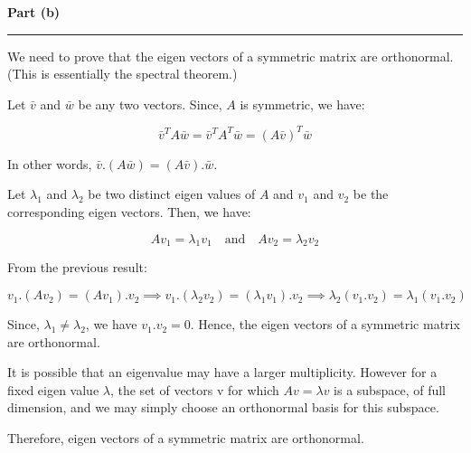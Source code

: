 \documentclass[a4paper,12pt]{article}
\newenvironment{solution}[2][]{%
    \begin{mdframed}[linecolor=blue!70!black, linewidth=2pt, roundcorner=10pt, backgroundcolor=yellow!10!white, skipabove=12pt, skipbelow=12pt]%
        \textbf{\large #2}
        \par\noindent\rule{\textwidth}{0.4pt}
}{
    \end{mdframed}
}
\begin{document}
\begin{solution}{Part (b)}
We need to prove that the eigen vectors of a symmetric matrix are orthonormal. (This is essentially the spectral theorem.)


Let $\bar{v}$ and $\bar{w}$ be any two vectors. Since, $A$ is symmetric, we have:

\begin{equation}
  \bar{v}^TA\bar{w} = \bar{v}^TA^T\bar{w} = (A\bar{v})^T\bar{w}
\end{equation}

In other words, $\bar{v} . (A\bar{w}) = (A\bar{v}) . \bar{w}$.


Let $\lambda_1$ and $\lambda_2$ be two distinct eigen values of $A$ and $v_1$ and $v_2$ be the corresponding eigen vectors. Then, we have:

\begin{equation}
  Av_1 = \lambda_1v_1 \quad \text{and} \quad Av_2 = \lambda_2v_2
\end{equation}

From the previous result:

\begin{equation}
  v_1 . (Av_2) = (Av_1) . v_2 \implies v_1 . (\lambda_2v_2) = (\lambda_1v_1) . v_2 \implies \lambda_2(v_1 . v_2) = \lambda_1(v_1 . v_2)
\end{equation}

Since, $\lambda_1 \neq \lambda_2$, we have $v_1 . v_2 = 0$. Hence, the eigen vectors of a symmetric matrix are orthonormal.


It is possible that an eigenvalue may have a larger multiplicity. However for a fixed eigen value $\lambda$, the set of vectors v for which $Av = \lambda v$ is a subspace, of full dimension, and we may simply choose an orthonormal basis for this subspace.


Therefore, eigen vectors of a symmetric matrix are orthonormal.
\end{solution}
\end{document}
